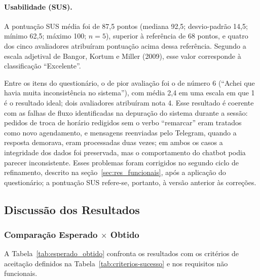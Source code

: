 \documentclass[12pt,a4paper]{extarticle}
\begin{document}
\paragraph{Usabilidade (SUS).}
\label{sec:res_usabilidade}
A pontuação SUS média foi de 87,5 pontos (mediana 92,5; desvio-padrão 14,5; mínimo 62,5; máximo 100; $n=5$), superior à referência de 68 pontos, e quatro dos cinco avaliadores atribuíram pontuação acima dessa referência. Segundo a escala adjetival de Bangor, Kortum e Miller (2009), esse valor corresponde à classificação ``Excelente''.



Entre os itens do questionário, o de pior avaliação foi o de número 6 (``Achei que havia muita inconsistência no sistema''), com média 2,4 em uma escala em que 1 é o resultado ideal; dois avaliadores atribuíram nota 4. Esse resultado é coerente com as falhas de fluxo identificadas na depuração do sistema durante a sessão: pedidos de troca de horário redigidos sem o verbo ``remarcar'' eram tratados como novo agendamento, e mensagens reenviadas pelo Telegram, quando a resposta demorava, eram processadas duas vezes; em ambos os casos a integridade dos dados foi preservada, mas o comportamento do chatbot podia parecer inconsistente. Esses problemas foram corrigidos no segundo ciclo de refinamento, descrito na seção~\ref{sec:res_funcionais}, após a aplicação do questionário; a pontuação SUS refere-se, portanto, à versão anterior às correções.

\subsection{Discussão dos Resultados}
\label{sec:discussao}

\subsubsection{Comparação Esperado $\times$ Obtido}
\label{sec:esperado_obtido}

A Tabela~\ref{tab:esperado_obtido} confronta os resultados com os critérios de aceitação definidos na Tabela~\ref{tab:criterios-sucesso} e nos requisitos não funcionais.
\end{document}
